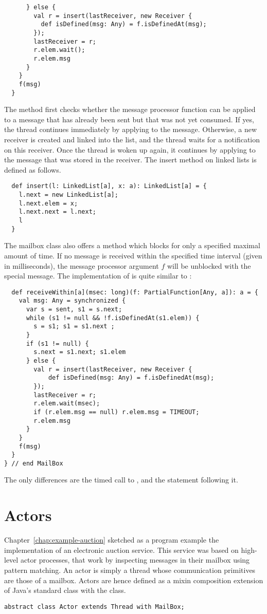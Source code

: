 {\begin{lstlisting}
      } else {
        val r = insert(lastReceiver, new Receiver {
          def isDefined(msg: Any) = f.isDefinedAt(msg);
        });
        lastReceiver = r;
        r.elem.wait();
        r.elem.msg
      }
    }
    f(msg)
  }
\end{lstlisting}
The  method first checks whether the message processor function
 can be applied to a message that has already been sent but that
was not yet consumed. If yes, the thread continues immediately by
applying  to the message. Otherwise, a new receiver is created
and linked into the  list, and the thread waits for a
notification on this receiver. Once the thread is woken up again, it
continues by applying  to the message that was stored in the
receiver. The insert method on linked lists is defined as follows.
\begin{lstlisting}
  def insert(l: LinkedList[a], x: a): LinkedList[a] = {
    l.next = new LinkedList[a];
    l.next.elem = x;
    l.next.next = l.next;
    l
  }
\end{lstlisting}
The mailbox class also offers a method 
which blocks for only a specified maximal amount of time.  If no
message is received within the specified time interval (given in
milliseconds), the message processor argument $f$ will be unblocked
with the special  message.  The implementation of
 is quite similar to :
\begin{lstlisting}
  def receiveWithin[a](msec: long)(f: PartialFunction[Any, a]): a = {
    val msg: Any = synchronized {
      var s = sent, s1 = s.next;
      while (s1 != null && !f.isDefinedAt(s1.elem)) {
        s = s1; s1 = s1.next ;
      }
      if (s1 != null) {
        s.next = s1.next; s1.elem
      } else {
        val r = insert(lastReceiver, new Receiver {
            def isDefined(msg: Any) = f.isDefinedAt(msg);
        });
        lastReceiver = r;
        r.elem.wait(msec);
        if (r.elem.msg == null) r.elem.msg = TIMEOUT;
        r.elem.msg
      }
    }
    f(msg)
  }
} // end MailBox
\end{lstlisting}
The only differences are the timed call to , and the
statement following it.

\section{Actors}
\label{sec:actors}

Chapter~\ref{chap:example-auction} sketched as a program example the
implementation of an electronic auction service. This service was
based on high-level actor processes, that work by inspecting messages
in their mailbox using pattern matching. An actor is simply a thread
whose communication primitives are those of a mailbox.  Actors are
hence defined as a mixin composition extension of Java's standard
 class with the  class.
\begin{lstlisting}
abstract class Actor extends Thread with MailBox;
\end{lstlisting}

}
